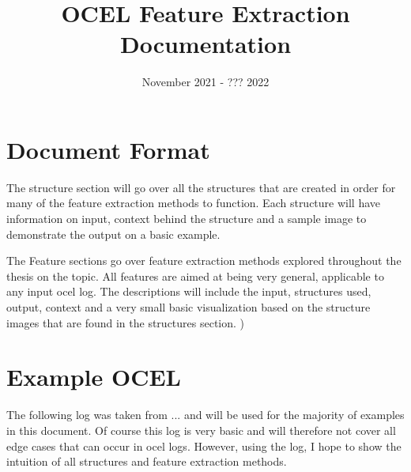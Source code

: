 \documentclass{article}
\title{OCEL Feature Extraction Documentation}
\date{November 2021 - ??? 2022}
\begin{document}
\maketitle

\tableofcontents
\pagebreak

\section{Document Format}
The structure section will go over all the structures that are created in order for many of the feature extraction methods to function. Each structure will have information on input, context behind the structure and a sample image to demonstrate the output on a basic example.

The Feature sections go over feature extraction methods explored throughout the thesis on the topic. All features are aimed at being very general, applicable to any input ocel log. The descriptions will include the input, structures used, output, context and a very small basic visualization based on the structure images that are found in the structures section. 
)

\section{Example OCEL}
The following log was taken from ... and will be used for the majority of examples in this document. Of course this log is very basic and will therefore not cover all edge cases that can occur in ocel logs. However, using the log, I hope to show the intuition of all structures and feature extraction methods.
\end{document}
